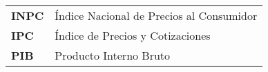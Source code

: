 \begin{tabular}{ll}
\textbf{INPC} & Índice Nacional de Precios al Consumidor \\
\textbf{IPC}  & Índice de Precios y Cotizaciones \\
\textbf{PIB}  & Producto Interno Bruto \\
\end{tabular}
